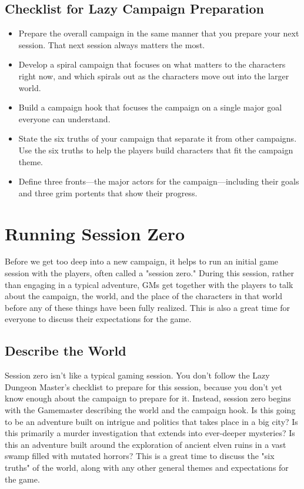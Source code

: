 \documentclass[10pt,a4paper,twoside,bg=print,twocolumn,openany,nodeprecatedcode]{dndbook}
\begin{document}
\subsection{Checklist for Lazy Campaign Preparation}

\begin{itemize}
\item Prepare the overall campaign in the same manner that you prepare your next session. That next session always matters the most.
\item Develop a spiral campaign that focuses on what matters to the characters right now, and which spirals out as the characters move out into the larger world.
\item Build a campaign hook that focuses the campaign on a single major goal everyone can understand.
\item State the six truths of your campaign that separate it from other campaigns. Use the six truths to help the players build characters that fit the campaign theme.
\item Define three fronts—the major actors for the campaign—including their goals and three grim portents that show their progress.
\end{itemize}

\section{Running Session Zero}
Before we get too deep into a new campaign, it helps to run an initial game session with the players, often called a "session zero." During this session, rather than engaging in a typical adventure, GMs get together with the players to talk about the campaign, the world, and the place of the characters in that world before any of these things have been fully realized. This is also a great time for everyone to discuss their expectations for the game.
\subsection{Describe the World}
Session zero isn't like a typical gaming session. You don't follow the Lazy Dungeon Master's checklist to prepare for this session, because you don't yet know enough about the campaign to prepare for it.
Instead, session zero begins with the Gamemaster describing the world and the campaign hook. Is this going to be an adventure built on intrigue and politics that takes place in a big city? Is this primarily a murder investigation that extends into ever-deeper mysteries? Is this an adventure built around the exploration of ancient elven ruins in a vast swamp filled with mutated horrors? This is a great time to discuss the "six truths" of the world, along with any other general themes and expectations for the game.
\end{document}
